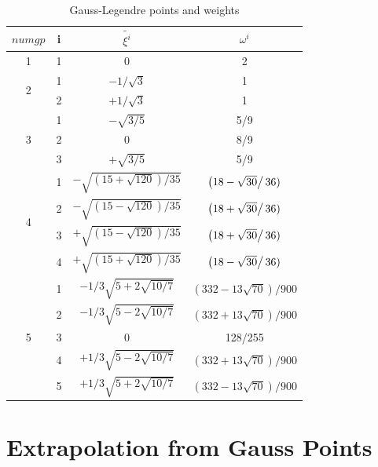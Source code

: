 \begin{table}
	\begin{center}
		\caption{Gauss-Legendre points and weights}\label{tab: Gauss table}
		\begin{tabular}{cccc}
			$numgp$         & i & $\tilde{\xi^i}$ & $\omega^i$  \\ \hline
			1                           &1& 0 & 2   \\ \hline
			\multirow{2}{*}{2} &1& $-1/\sqrt{3}$ & 1   \\
			&2& $+1/\sqrt{3}$ & 1   \\ \hline
			\multirow{3}{*}{3} &1& $-\sqrt{3/5}$ &5/9 \\
			&2& 0                &8/9 \\
			&3& $+\sqrt{3/5}$ &5/9 \\ \hline
			\multirow{4}{*}{4}&1& $-\sqrt{\left(15+\sqrt{120}\right)/35}$ & $\left(18-\sqrt{30}\right/36)$ \\
			&2& $-\sqrt{\left(15-\sqrt{120}\right)/35}$ & $\left(18+\sqrt{30}\right/36)$ \\
			&3& $+\sqrt{\left(15-\sqrt{120}\right)/35}$ & $\left(18+\sqrt{30}\right/36)$ \\
			&4& $+\sqrt{\left(15+\sqrt{120}\right)/35}$ & $\left(18-\sqrt{30}\right/36)$ \\ \hline
			\multirow{5}{*}{5}&1& $-1/3\sqrt{5+2\sqrt{10/7}}$ & $\left(332-13\sqrt{70}\right)/900$ \\
			&2& $-1/3\sqrt{5-2\sqrt{10/7}}$ & $\left(332+13\sqrt{70}\right)/900$ \\
			&3& 0 & 128/255 \\
			&4& $+1/3\sqrt{5-2\sqrt{10/7}}$ & $\left(332+13\sqrt{70}\right)/900$ \\
			&5& $+1/3\sqrt{5+2\sqrt{10/7}}$ & $\left(332-13\sqrt{70}\right)/900$ \\ \hline
		\end{tabular}
	\end{center}
	
\end{table}

\section{Extrapolation from Gauss Points}
